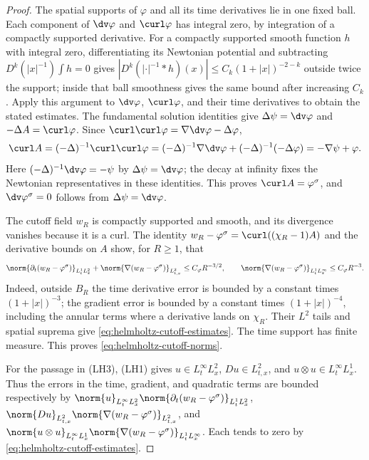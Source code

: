 \documentclass[11pt,reqno]{amsart}
\begin{document}
\begin{proof}
The spatial supports of $\varphi$ and all its time derivatives lie in one
fixed ball. Each component of $\dv\varphi$ and $\curl\varphi$ has integral
zero, by integration of a compactly supported derivative. For a compactly
supported smooth function $h$ with integral zero, differentiating its
Newtonian potential and subtracting $D^k(|x|^{-1})\int h=0$ gives
$|D^k(|\cdot|^{-1}*h)(x)|\le C_k(1+|x|)^{-2-k}$ outside twice the support;
inside that ball smoothness gives the same bound after increasing $C_k$.
Apply this argument to $\dv\varphi$, $\curl\varphi$, and their time
derivatives to obtain the stated estimates. The fundamental solution
identities give $\Delta\psi=\dv\varphi$ and
$-\Delta A=\curl\varphi$. Since
$\curl\curl\varphi=\nabla\dv\varphi-\Delta\varphi$,
\begin{equation*}
\curl A=(-\Delta)^{-1}\curl\curl\varphi
=(-\Delta)^{-1}\nabla\dv\varphi+(-\Delta)^{-1}(-\Delta\varphi)
=-\nabla\psi+\varphi.
\end{equation*}
Here $(-\Delta)^{-1}\dv\varphi=-\psi$ by
$\Delta\psi=\dv\varphi$; the decay at infinity fixes the Newtonian
representatives in these identities. This proves
$\curl A=\varphi^\sigma$, and $\dv\varphi^\sigma=0$ follows from
$\Delta\psi=\dv\varphi$.

The cutoff field $w_R$ is compactly supported and smooth, and its divergence
vanishes because it is a curl. The identity
$w_R-\varphi^\sigma=\curl((\chi_R-1)A)$ and the derivative bounds on $A$
show, for $R\ge1$, that
\begin{equation}\label{eq:helmholtz-cutoff-estimates}
\norm{\partial_t(w_R-\varphi^\sigma)}_{L^1_tL^2_x}
 +\norm{\nabla(w_R-\varphi^\sigma)}_{L^2_{t,x}}
 \le C_\varphi R^{-3/2},\qquad
\norm{\nabla(w_R-\varphi^\sigma)}_{L^1_tL^\infty_x}
 \le C_\varphi R^{-3}.
\end{equation}
Indeed, outside $B_R$ the time derivative error is bounded by a constant
times $(1+|x|)^{-3}$; the gradient error is bounded by a constant times
$(1+|x|)^{-4}$, including the annular terms where a derivative lands on
$\chi_R$. Their $L^2$ tails and spatial suprema give
\eqref{eq:helmholtz-cutoff-estimates}. The time support has finite measure.
This proves \eqref{eq:helmholtz-cutoff-norms}.

For the passage in (LH3), (LH1) gives $u\in L^\infty_tL^2_x$,
$Du\in L^2_{t,x}$, and
$u\otimes u\in L^\infty_tL^1_x$. Thus the errors in the time, gradient,
and quadratic terms are bounded respectively by
$\norm{u}_{L^\infty_tL^2_x}\norm{\partial_t(w_R-\varphi^\sigma)}_{L^1_tL^2_x}$,
$\norm{Du}_{L^2_{t,x}}\norm{\nabla(w_R-\varphi^\sigma)}_{L^2_{t,x}}$, and
$\norm{u\otimes u}_{L^\infty_tL^1_x}
\norm{\nabla(w_R-\varphi^\sigma)}_{L^1_tL^\infty_x}$.
Each tends to zero by \eqref{eq:helmholtz-cutoff-estimates}.
\end{proof}
\end{document}

